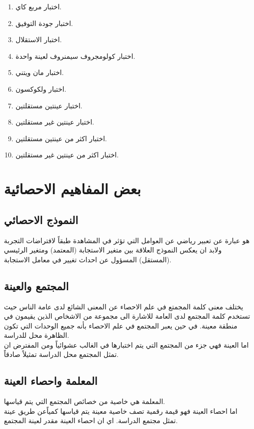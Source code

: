 \begin{enumerate}
	\item اختبار مربع كاي.
	\item اختبار جودة التوفيق.
	\item اختبار الاستقلال.
	\item اختبار كولومجروف سيمنروف لعينة واحدة.
	\item اختبار مان ويتني.
	\item  اختبار ولكوكسون.
	\item اختبار عينتين مستقلتين.
	\item اختبار عينتين غير مستقلتين.
	\item اختبار اكثر من عينتين مستقلتين.
	\item اختبار اكثر من عينتين غير مستقلتين.
\end{enumerate}

\section{بعض المفاهيم الاحصائية}

\subsection{النموذج الاحصائي}
هو عبارة عن تعبير رياضي عن العوامل التي تؤثر في المشاهدة طبقاً لافتراضات التجربة ولابد ان يعكس النموذج العلاقة بين متغير الاستجابة (المعتمد) ومتغير الرئيسي (المستقل) المسؤول عن احداث تغيير في معامل الاستجابة.

\subsection{المجتمع والعينة}
يختلف معنى كلمة المجمتع في علم الاحصاء عن المعنى الشائع لدى عامة الناس حيث تستخدم كلمة المجتمع لدى العامة للاشارة الى مجموعة من الاشخاص الذين يقيمون في منطقة معينة. في حين يعبر المجتمع في علم الاحصاء بأنه جميع الوحدات التي تكون الظاهرة محل للدراسة.\\
\noindent
اما العينة فهي جزء من المجتمع التي يتم اختبارها في الغالب عشوائياً ومن المفترض ان تمثل المجتمع محل الدراسة تمثيلاً صادقاً.

\subsection{المعلمة واحصاء العينة}
المعلمة هي خاصية من خصائص المجتمع التي يتم قياسها.\\
اما احصاء العينة فهو قيمة رقمية تصف خاصية معينة يتم قياسها كمياًعن طريق عينة تمثل مجتمع الدراسة. اي ان احصاء العينة مقدر لعينة المجتمع.

